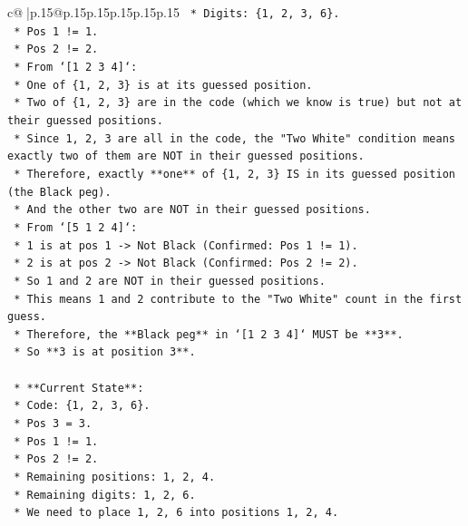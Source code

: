 \documentclass{article}
\begin{document}
{\begin{supertabular}{c@{$\;$}|p{.15\linewidth}@{}p{.15\linewidth}p{.15\linewidth}p{.15\linewidth}p{.15\linewidth}p{.15\linewidth}}
{{{\texttt{        *   Digits: \{1, 2, 3, 6\}.} \\
\texttt{        *   Pos 1 != 1.} \\
\texttt{        *   Pos 2 != 2.} \\
\texttt{        *   From `{[}1 2 3 4{]}`:} \\
\texttt{            *   One of \{1, 2, 3\} is at its guessed position.} \\
\texttt{            *   Two of \{1, 2, 3\} are in the code (which we know is true) but not at their guessed positions.} \\
\texttt{            *   Since 1, 2, 3 are all in the code, the "Two White" condition means exactly two of them are NOT in their guessed positions.} \\
\texttt{            *   Therefore, exactly **one** of \{1, 2, 3\} IS in its guessed position (the Black peg).} \\
\texttt{            *   And the other two are NOT in their guessed positions.} \\
\texttt{        *   From `{[}5 1 2 4{]}`:} \\
\texttt{            *   1 is at pos 1 {-}> Not Black (Confirmed: Pos 1 != 1).} \\
\texttt{            *   2 is at pos 2 {-}> Not Black (Confirmed: Pos 2 != 2).} \\
\texttt{            *   So 1 and 2 are NOT in their guessed positions.} \\
\texttt{            *   This means 1 and 2 contribute to the "Two White" count in the first guess.} \\
\texttt{            *   Therefore, the **Black peg** in `{[}1 2 3 4{]}` MUST be **3**.} \\
\texttt{            *   So **3 is at position 3**.} \\
\\ 
\texttt{    *   **Current State**:} \\
\texttt{        *   Code: \{1, 2, 3, 6\}.} \\
\texttt{        *   Pos 3 = 3.} \\
\texttt{        *   Pos 1 != 1.} \\
\texttt{        *   Pos 2 != 2.} \\
\texttt{        *   Remaining positions: 1, 2, 4.} \\
\texttt{        *   Remaining digits: 1, 2, 6.} \\
\texttt{        *   We need to place 1, 2, 6 into positions 1, 2, 4.} \\
}}}
\end{supertabular}}
\end{document}
